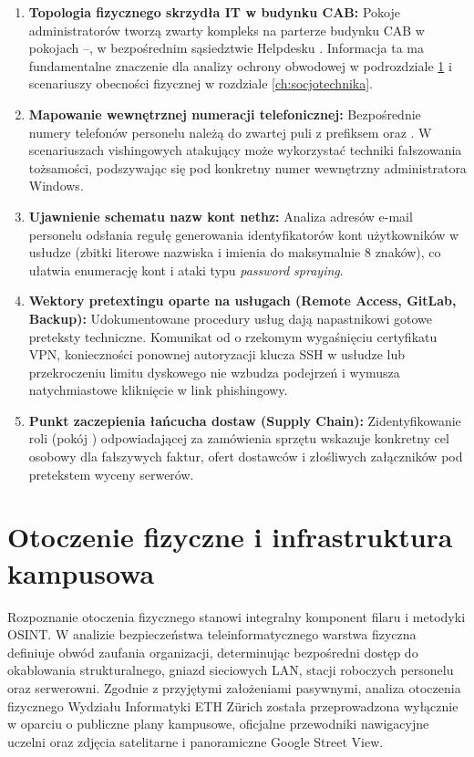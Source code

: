 \begin{enumerate}
    \item \textbf{Topologia fizycznego skrzydła IT w budynku CAB:} Pokoje administratorów tworzą zwarty kompleks na parterze budynku CAB w pokojach --, w bezpośrednim sąsiedztwie Helpdesku . Informacja ta ma fundamentalne znaczenie dla analizy ochrony obwodowej w podrozdziale \ref{sec:lokalizacja} i scenariuszy obecności fizycznej w rozdziale \ref{ch:socjotechnika}.
    \item \textbf{Mapowanie wewnętrznej numeracji telefonicznej:} Bezpośrednie numery telefonów personelu należą do zwartej puli z prefiksem  oraz . W scenariuszach vishingowych atakujący może wykorzystać techniki fałszowania tożsamości, podszywając się pod konkretny numer wewnętrzny administratora Windows.
    \item \textbf{Ujawnienie schematu nazw kont nethz:} Analiza adresów e-mail personelu odsłania regułę generowania identyfikatorów kont użytkowników w usłudze  (zbitki literowe nazwiska i imienia do maksymalnie 8 znaków), co ułatwia enumerację kont i ataki typu \textit{password spraying}.
    \item \textbf{Wektory pretextingu oparte na usługach (Remote Access, GitLab, Backup):} Udokumentowane procedury usług dają napastnikowi gotowe preteksty techniczne. Komunikat od  o rzekomym wygaśnięciu certyfikatu VPN, konieczności ponownej autoryzacji klucza SSH w usłudze  lub przekroczeniu limitu dyskowego nie wzbudza podejrzeń i wymusza natychmiastowe kliknięcie w link phishingowy.
    \item \textbf{Punkt zaczepienia łańcucha dostaw (Supply Chain):} Zidentyfikowanie roli  (pokój ) odpowiadającej za zamówienia sprzętu wskazuje konkretny cel osobowy dla fałszywych faktur, ofert dostawców i złośliwych załączników pod pretekstem wyceny serwerów.
\end{enumerate}

\section{Otoczenie fizyczne i infrastruktura kampusowa}\label{sec:lokalizacja}

Rozpoznanie otoczenia fizycznego stanowi integralny komponent filaru i metodyki OSINT. W analizie bezpieczeństwa teleinformatycznego warstwa fizyczna definiuje obwód zaufania organizacji, determinując bezpośredni dostęp do okablowania strukturalnego, gniazd sieciowych LAN, stacji roboczych personelu oraz serwerowni. Zgodnie z przyjętymi założeniami pasywnymi, analiza otoczenia fizycznego Wydziału Informatyki ETH Zürich została przeprowadzona wyłącznie w oparciu o publiczne plany kampusowe, oficjalne przewodniki nawigacyjne uczelni oraz zdjęcia satelitarne i panoramiczne Google Street View.

